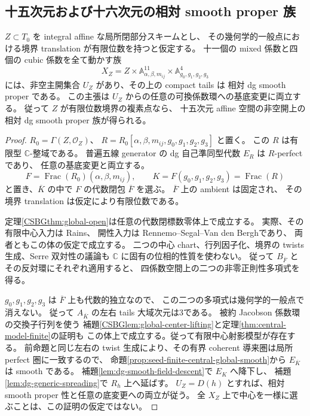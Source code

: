 \subsection{十五次元および十六次元の相対 smooth proper 族}

\begin{proposition}[有限位数境界を固定した全混合変形]
\label{prop:seed-torsion-base-relative-smooth}
$Z\subset T_0$ を integral affine な局所閉部分スキームとし、
その幾何学的一般点における境界 translation が有限位数を持つと仮定する。
十一個の mixed 係数と四個の cubic 係数を全て動かす族
\[
 X_Z=Z\times\mathbb A^{11}_{\alpha,\beta,m_{ij}}
           \times\mathbb A^4_{g_0,g_1,g_2,g_3}
\]
には、非空主開集合 $U_Z$ があり、その上の compact tails は
相対 dg smooth proper である。
この主張は $U_Z$ からの任意の可換係数環への基底変更に両立する。
従って $Z$ が有限位数境界の複素点なら、
十五次元 affine 空間の非空開上の相対 dg smooth proper 族が得られる。
\end{proposition}

\begin{proof}
$R_0=\Gamma(Z,\mathcal O_Z)$、
$R=R_0[\alpha,\beta,m_{ij},g_0,g_1,g_2,g_3]$ と置く。
この $R$ は有限型 $\mathbb C$-整域である。
普遍五線 generator の dg 自己準同型代数 $E_R$ は $R$-perfect であり、
任意の基底変更と両立する。
\[
 F=\operatorname{Frac}(R_0)(\alpha,\beta,m_{ij}),\qquad
 K=F(g_0,g_1,g_2,g_3)=\operatorname{Frac}(R)
\]
と置き、$\overline K$ の中で $F$ の代数閉包 $\overline F$ を選ぶ。
$\overline F$ 上の ambient は固定され、
その境界 translation は仮定により有限位数である。

定理\ref{CSBGthm:global-open}は任意の代数閉標数零体上で成立する。
実際、その有限中心入力は Rains\cite[Theorem~2.13]{Rains}、
開性入力は Rennemo--Segal--Van den Bergh\cite[Proposition~2.1]{RSVdB}であり、
両者ともこの体の仮定で成立する。
二つの中心 chart、行列因子化、境界の twists 生成、Serre 双対性の議論も
\(\mathbb C\) に固有の位相的性質を使わない。
従って $B_{\overline F}$ とその反対環にそれぞれ適用すると、
四係数空間上の二つの非零正則性多項式を得る。

$g_0,g_1,g_2,g_3$ は $\overline F$ 上も代数的独立なので、
この二つの多項式は幾何学的一般点で消えない。
従って $A_{\overline K}$ の左右 tails 大域次元は3である。
被約 Jacobson 係数環の交換子行列を使う
補題\ref{CSBGlem:global-center-lifting}と定理\ref{thm:central-model-finite}の証明も
この体上で成立する。従って有限中心射影模型が存在する。
前命題と同じ左右の twist 生成により、その有界 coherent 導来圏は局所 perfect 圏に一致するので、
命題\ref{prop:seed-finite-central-global-smooth}から
$E_{\overline K}$ は smooth である。
補題\ref{lem:dg-smooth-field-descent}で $E_K$ へ降下し、
補題\ref{lem:dg-generic-spreading}で $R_h$ 上へ延ばす。
$U_Z=D(h)$ とすれば、相対 smooth proper 性と任意の底変更への両立が従う。
全 $X_Z$ 上で中心を一様に選ぶことは、この証明の仮定ではない。
\end{proof}

